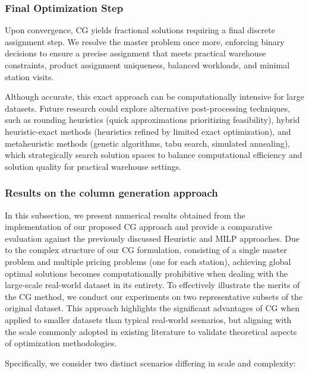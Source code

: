 \documentclass[11pt]{elsarticle}
\begin{document}
\subsubsection{Final Optimization Step}\label{par:final_optimization_step}



Upon convergence, CG yields fractional solutions requiring a final discrete assignment step. We resolve the master problem once more, enforcing binary decisions to ensure a precise assignment that meets practical warehouse constraints, product assignment uniqueness, balanced workloads, and minimal station visits.

Although accurate, this exact approach can be computationally intensive for large datasets. Future research could explore alternative post-processing techniques, such as rounding heuristics (quick approximations prioritizing feasibility), hybrid heuristic-exact methods (heuristics refined by limited exact optimization), and metaheuristic methods (genetic algorithms, tabu search, simulated annealing), which strategically search solution spaces to balance computational efficiency and solution quality for practical warehouse settings.



\subsubsection{Results on the column generation approach}

In this subsection, we present numerical results obtained from the implementation of our proposed CG approach and provide a comparative evaluation against the previously discussed Heuristic and MILP approaches. Due to the complex structure of our CG formulation, consisting of a single master problem and multiple pricing problems (one for each station), achieving global optimal solutions becomes computationally prohibitive when dealing with the large-scale real-world dataset in its entirety. To effectively illustrate the merits of the CG method, we conduct our experiments on two representative subsets of the original dataset. This approach highlights the significant advantages of CG when applied to smaller datasets than typical real-world scenarios, but aligning with the scale commonly adopted in existing literature to validate theoretical aspects of optimization methodologies.

Specifically, we consider two distinct scenarios differing in scale and complexity:
\end{document}
